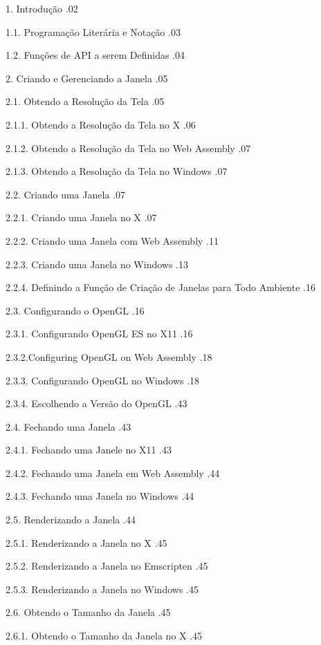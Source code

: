 
\def\indice#1{\leaders\hbox{.}\hfill #1}

1. Introdução \indice{02}

1.1. Programação Literária e Notação \indice{03}

1.2. Funções de API a serem Definidas \indice{04}

2. Criando e Gerenciando a Janela \indice{05}

2.1. Obtendo a Resolução da Tela \indice{05}

2.1.1. Obtendo a Resolução da Tela no X \indice{06}

2.1.2. Obtendo a Resolução da Tela no Web Assembly \indice{07}

2.1.3. Obtendo a Resolução da Tela no Windows \indice{07}

2.2. Criando uma Janela \indice{07}

2.2.1. Criando uma Janela no X \indice{07}

2.2.2. Criando uma Janela com Web Assembly \indice{11}

2.2.3. Criando uma Janela no Windows \indice{13}

2.2.4. Definindo a Função de Criação de Janelas para Todo Ambiente \indice{16}

2.3. Configurando o OpenGL \indice{16}

2.3.1. Configurando OpenGL ES no X11 \indice{16}

2.3.2.Configuring OpenGL on Web Assembly \indice{18}

2.3.3. Configurando OpenGL no Windows \indice{18}

2.3.4. Escolhendo a Versão do OpenGL \indice{43}

2.4. Fechando uma Janela \indice{43}

2.4.1. Fechando uma Janele no X11 \indice{43}

2.4.2. Fechando uma Janela em Web Assembly \indice{44}

2.4.3. Fechando uma Janela no Windows \indice{44}

2.5. Renderizando a Janela \indice{44}

2.5.1. Renderizando a Janela no X \indice{45}

2.5.2. Renderizando a Janela no Emscripten \indice{45}

2.5.3. Renderizando a Janela no Windows \indice{45}

2.6. Obtendo o Tamanho da Janela \indice{45}

2.6.1. Obtendo o Tamanho da Janela no X \indice{45}

